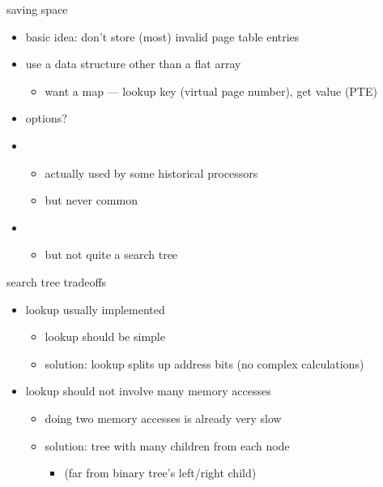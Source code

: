 \begin{frame}{saving space}
\begin{itemize}
    \item basic idea: don't store (most) invalid page table entries
    \item use a data structure other than a flat array
        \begin{itemize}
        \item want a map --- lookup key (virtual page number), get value (PTE)
        \end{itemize}
    \item options?
    \vspace{.5cm}
    \item<2-> 
        \begin{itemize}
        \item<2-> actually used by some historical processors
        \item<2-> but never common
        \end{itemize}
    \item<3-> 
        \begin{itemize}
        \item<3-> but not quite a search tree
        \end{itemize}
\end{itemize}
\end{frame}

\begin{frame}{search tree tradeoffs}
    \begin{itemize}
    \item lookup usually implemented 
        \begin{itemize}
        \item lookup should be simple
        \item solution: lookup splits up address bits (no complex calculations)
        \end{itemize}
    \item lookup should not involve many memory accesses
        \begin{itemize}
        \item doing two memory accesses is already very slow
        \item solution: tree with many children from each node
            \begin{itemize}
            \item (far from binary tree's left/right child)
            \end{itemize}
        \end{itemize}
    \end{itemize}
\end{frame}

